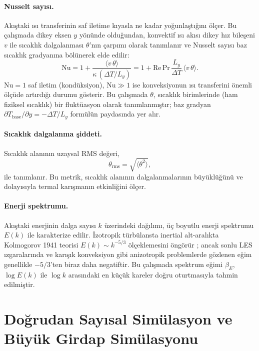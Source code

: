 \paragraph{Nusselt sayısı.} Akıştaki ısı transferinin saf iletime kıyasla ne kadar yoğunlaştığını ölçer. Bu çalışmada dikey eksen $y$ yönünde olduğundan, konvektif ısı akısı dikey hız bileşeni $v$ ile sıcaklık dalgalanması $\theta$'nın çarpımı olarak tanımlanır ve Nusselt sayısı baz sıcaklık gradyanına bölünerek elde edilir:
\begin{equation}
\mathrm{Nu} = 1 + \frac{\langle v\,\theta\rangle}{\kappa\,(\Delta T/L_{y})}
= 1 + \mathrm{Re}\,\mathrm{Pr}\,\frac{L_{y}}{\Delta T}\,\langle v\,\theta\rangle.
\label{eq:nusselt}
\end{equation}
$\mathrm{Nu}=1$ saf iletim (kondüksiyon), $\mathrm{Nu}\gg 1$ ise konveksiyonun ısı transferini önemli ölçüde artırdığı durumu gösterir. Bu çalışmada $\theta$, sıcaklık birimlerinde (ham fiziksel sıcaklık) bir fluktüasyon olarak tanımlanmıştır; baz gradyan $\partial T_{\mathrm{base}}/\partial y = -\Delta T/L_{y}$ formülün paydasında yer alır.

\paragraph{Sıcaklık dalgalanma şiddeti.} Sıcaklık alanının uzaysal RMS değeri,
\begin{equation}
\theta_{\mathrm{rms}} = \sqrt{\langle \theta^{2}\rangle},
\label{eq:theta_rms}
\end{equation}
ile tanımlanır. Bu metrik, sıcaklık alanının dalgalanmalarının büyüklüğünü ve dolayısıyla termal karışmanın etkinliğini ölçer.

\paragraph{Enerji spektrumu.} Akıştaki enerjinin dalga sayısı $k$ üzerindeki dağılımı, üç boyutlu enerji spektrumu $E(k)$ ile karakterize edilir. İzotropik türbülansta inertial alt-aralıkta Kolmogorov 1941 teorisi $E(k)\sim k^{-5/3}$ ölçeklemesini öngörür \cite{kolmogorov_1941, pope_turbulence_2000}; ancak sonlu LES ızgaralarında ve karışık konveksiyon gibi anizotropik problemlerde gözlenen eğim genellikle $-5/3$'ten biraz daha negatiftir. Bu çalışmada spektrum eğimi $\beta_{E}$, $\log E(k)$ ile $\log k$ arasındaki en küçük kareler doğru oturtmasıyla tahmin edilmiştir.

\section{Doğrudan Sayısal Simülasyon ve Büyük Girdap Simülasyonu}

